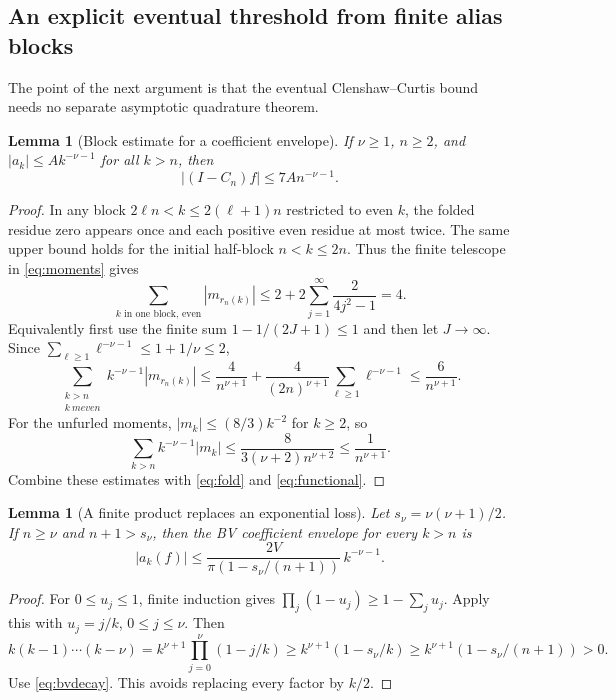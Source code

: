 \documentclass[11pt]{article}
\newtheorem{lemma}[theorem]{Lemma}
\theoremstyle{remark}\newtheorem{remark}[theorem]{Remark}
\begin{document}
\subsection{An explicit eventual threshold from finite alias blocks}
The point of the next argument is that the eventual Clenshaw--Curtis
bound needs no separate asymptotic quadrature theorem.

\begin{lemma}[Block estimate for a coefficient envelope]\label{lem:block}
If $\nu\ge1$, $n\ge2$, and $|a_k|\le A k^{-\nu-1}$ for all $k>n$, then
\begin{equation}\label{eq:blockrate}
 |(I-C_n)f|\le 7A n^{-\nu-1}.
\end{equation}
\end{lemma}
\begin{proof}
In any block $2\ell n<k\le2(\ell+1)n$ restricted to even $k$, the
folded residue zero appears once and each positive even residue at most
twice. The same upper bound holds for the initial half-block $n<k\le2n$.
Thus the finite telescope in \eqref{eq:moments} gives
\[
 \sum_{k\text{ in one block, even}}|m_{r_n(k)}|
 \le2+2\sum_{j=1}^\infty\frac2{4j^2-1}=4.
\]
Equivalently first use the finite sum $1-1/(2J+1)\le1$ and then let
$J\to\infty$. Since $\sum_{\ell\ge1}\ell^{-\nu-1}\le1+1/\nu\le2$,
\[
 \sum_{\substack{k>n\\k\ {
m even}}}k^{-\nu-1}|m_{r_n(k)}|
 \le\frac4{n^{\nu+1}}+
       \frac4{(2n)^{\nu+1}}\sum_{\ell\ge1}\ell^{-\nu-1}
 \le\frac6{n^{\nu+1}}.
\]
For the unfurled moments, $|m_k|\le(8/3)k^{-2}$ for $k\ge2$, so
\[
 \sum_{k>n}k^{-\nu-1}|m_k|
 \le\frac8{3(\nu+2)n^{\nu+2}}\le\frac1{n^{\nu+1}}.
\]
Combine these estimates with \eqref{eq:fold} and \eqref{eq:functional}.
\end{proof}

\begin{lemma}[A finite product replaces an exponential loss]\label{lem:product}
Let $s_\nu=\nu(\nu+1)/2$. If $n\ge\nu$ and $n+1>s_\nu$, then the BV
coefficient envelope for every $k>n$ is
\begin{equation}\label{eq:envelope}
 |a_k(f)|\le
 \frac{2V}{\pi(1-s_\nu/(n+1))}\,k^{-\nu-1}.
\end{equation}
\end{lemma}
\begin{proof}
For $0\le u_j\le1$, finite induction gives
$\prod_j(1-u_j)\ge1-\sum_j u_j$. Apply this with $u_j=j/k$,
$0\le j\le\nu$. Then
\[
 k(k-1)\cdots(k-\nu)
 =k^{\nu+1}\prod_{j=0}^\nu(1-j/k)
 \ge k^{\nu+1}(1-s_\nu/k)
 \ge k^{\nu+1}(1-s_\nu/(n+1))>0.
\]
Use \eqref{eq:bvdecay}. This avoids replacing every factor by $k/2$.
\end{proof}
\end{document}
